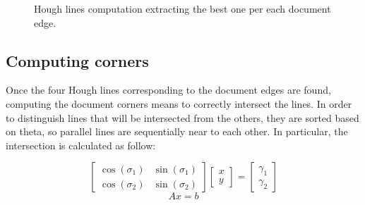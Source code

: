 \documentclass[a4paper]{article}
\begin{document}
\begin{figure}[H]
	\caption{Hough lines computation extracting the best one per each document edge.}
	\label{fig:hough}
\end{figure}

\subsection{Computing corners}

Once the four Hough lines corresponding to the document edges are found, computing the document corners means to correctly intersect the lines. In order to distinguish lines that will be intersected from the others, they are sorted based on theta, so parallel lines are sequentially near to each other. In particular, the intersection is calculated as follow:

\begin{equation*}
	\begin{bmatrix} \cos(\sigma_1) & \sin(\sigma_1) \\ \cos(\sigma_2) & \sin(\sigma_2) \end{bmatrix}
	\begin{bmatrix} x \\ y \end{bmatrix}
	=
	\begin{bmatrix} \gamma_1 \\ \gamma_2 \end{bmatrix}
\end{equation*}
\begin{equation*}
	Ax = b
\end{equation*}
\end{document}
